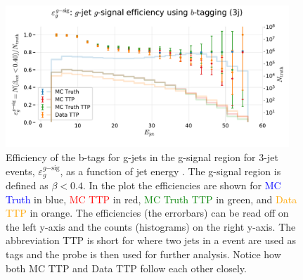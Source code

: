 \begin{figure}
  \includegraphics[width=0.95\textwidth, trim=0 0 0 40, clip]{figures/quarks/eff_g_gsig-down_sample=1.00-ML_vars=vertex-selection=b-ejet_min=4-n_iter_RS_lgb=99-n_iter_RS_xgb=9-cdot_cut=0.90-version=19.pdf}
  \caption[b-Tagging Efficiency $\varepsilon_g^{g\mathrm{-sig}}$ as a function of jet energy]
          {Efficiency of the b-tags for g-jets in the g-signal region for 3-jet events, $\varepsilon_g^{g\mathrm{-sig}}$, as a function of jet energy . The g-signal region is defined as $\beta < 0.4$. In the plot the efficiencies are shown for \textcolor{blue}{MC Truth} in blue, \textcolor{red}{MC TTP} in red, \textcolor{green}{MC Truth TTP} in green, and \textcolor{orange}{Data TTP} in orange. The efficiencies (the errorbars) can be read off on the left y-axis and the counts (histograms) on the right y-axis. The abbreviation TTP is short for  where two jets in a event are used as tags and the probe is then used for further analysis. Notice how both MC TTP and Data TTP follow each other closely.  
          } 
  \label{fig:q:effiency_btag_gjet_gsig}
\end{figure}

